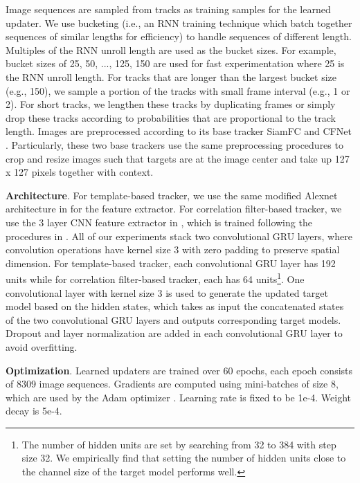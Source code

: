 \documentclass[journal]{IEEEtran}
\begin{document}
Image sequences are sampled from tracks as training samples for the learned updater. We use bucketing \cite{khomenko2016accelerating} (i.e., an RNN training technique which batch together sequences of similar lengths for efficiency) to handle sequences of different length. Multiples of the RNN unroll length are used as the bucket sizes. For example, bucket sizes of 25, 50, ..., 125, 150 are used for fast experimentation where 25 is the RNN unroll length. For tracks that are longer than the largest bucket size (e.g., 150), we sample a portion of the tracks with small frame interval (e.g., 1 or 2). For short tracks, we lengthen these tracks by duplicating frames or simply drop these tracks according to probabilities that are proportional to the track length. Images are preprocessed according to its base tracker SiamFC \cite{bertinetto2016fully} and CFNet \cite{valmadre2017end}. Particularly, these two base trackers use the same preprocessing procedures to crop and resize images such that targets are at the image center and take up 127 x 127 pixels together with context.

\textbf{Architecture}. For template-based tracker, we use the same modified Alexnet architecture in \cite{bertinetto2016fully} for the feature extractor. 
 For correlation filter-based tracker, we use the 3 layer CNN feature extractor in \cite{valmadre2017end}, which is trained following the procedures in \cite{bertinetto2016fully}. All of our experiments stack two convolutional GRU layers, where convolution operations have kernel size 3 with zero padding to preserve spatial dimension. For template-based tracker, each convolutional GRU layer has 192 units while for correlation filter-based tracker, each has 64 units\footnote{The number of hidden units are set by searching from 32 to 384 with step size 32. We empirically find that setting the number of hidden units close to the channel size of the target model performs well.}. One convolutional layer with kernel size 3 is used to generate the updated target model based on the hidden states, which takes as input the concatenated states of the two convolutional GRU layers and outputs corresponding target models. Dropout \cite{zaremba2014recurrent} and layer normalization \cite{ba2016layer} are added in each convolutional GRU layer to avoid overfitting.

\textbf{Optimization}. Learned updaters are trained over 60 epochs, each epoch consists of 8309 image sequences. Gradients are computed using mini-batches of size 8, which are used by the Adam optimizer \cite{kingma2014adam}. Learning rate is fixed to be 1e-4. Weight decay is 5e-4. 
\end{document}
